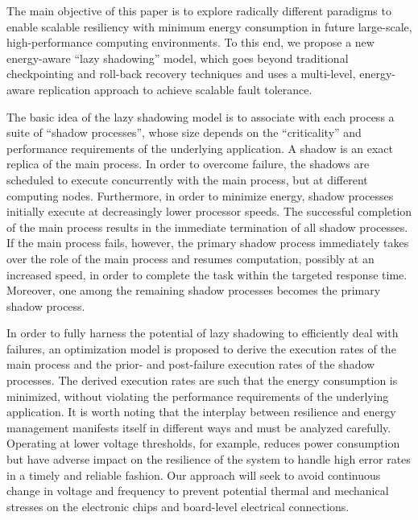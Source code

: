 The main objective of this paper is to explore radically different
paradigms to enable scalable resiliency with minimum energy
consumption in future large-scale, high-performance computing environments. To this
end, we propose a new energy-aware ``lazy shadowing'' model, %
which goes beyond traditional checkpointing
and roll-back recovery techniques and uses a multi-level,
energy-aware replication approach to achieve scalable fault tolerance.

The basic idea of the lazy shadowing model is to associate with each
process a suite of ``shadow processes'', whose size depends on the
``criticality'' and performance requirements of the underlying
application. A shadow is an exact replica of the main process. In
order to overcome failure, the shadows are scheduled to execute
concurrently with the main process, but at different computing
nodes. Furthermore, in order to minimize energy, shadow processes
initially execute at decreasingly lower processor speeds. The
successful completion of the main process results in the immediate
termination of all shadow processes. If the main process fails, however,
the primary shadow process immediately takes over the role of the main
process and resumes computation, possibly at an increased speed, in
order to complete the task within the targeted response time. Moreover, one among the remaining shadow processes
becomes the primary shadow process.

In order to fully harness the potential of lazy shadowing to efficiently deal with failures, an optimization model is proposed to derive the execution rates of the main process and the prior- and post-failure execution rates of the shadow processes. The derived execution rates are such that the energy consumption is minimized, without violating the performance requirements of the underlying application. It is worth noting that the interplay between resilience and energy management manifests itself in different ways and must be analyzed carefully. Operating at lower voltage thresholds, for example, reduces power consumption but have adverse impact on the resilience of the system to handle high error rates in a timely and reliable fashion. Our approach will seek to avoid continuous change in voltage and frequency to prevent potential thermal and mechanical stresses on the electronic chips and board-level electrical connections. 

